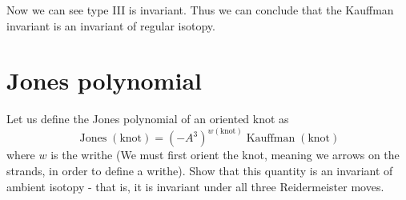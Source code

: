 \documentclass{book}
\begin{document}
Now we can see type III is invariant. Thus we can conclude that the Kauffman invariant is an invariant of regular isotopy.

\section{Jones polynomial}
Let us define the Jones polynomial of an oriented knot as
\begin{equation*}
\operatorname{Jones} (\text{knot} )=(-A^{3} )^{w(\text{knot} )}\operatorname{Kauffman} (\text{knot} )
\end{equation*}
where $w$ is the writhe (We must first orient the knot, meaning we arrows on the strands, in order to define a writhe). Show that this quantity is an invariant of ambient isotopy - that is, it is invariant under all three Reidermeister moves.
\end{document}
